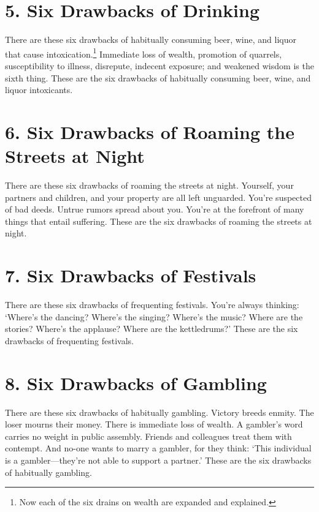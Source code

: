 \documentclass[12pt,openany]{book}%
\begin{document}
\section*{5. Six Drawbacks of Drinking }

There are these six drawbacks of habitually consuming beer, wine, and liquor that cause intoxication.\footnote{Now each of the six drains on wealth are expanded and explained. } Immediate loss of wealth, promotion of quarrels, susceptibility to illness, disrepute, indecent exposure; and weakened wisdom is the sixth thing. These are the six drawbacks of habitually consuming beer, wine, and liquor intoxicants. 

\section*{6. Six Drawbacks of Roaming the Streets at Night }

There are these six drawbacks of roaming the streets at night. Yourself, your partners and children, and your property are all left unguarded. You’re suspected of bad deeds. Untrue rumors spread about you. You’re at the forefront of many things that entail suffering. These are the six drawbacks of roaming the streets at night. 

\section*{7. Six Drawbacks of Festivals }

There are these six drawbacks of frequenting festivals. You’re always thinking: ‘Where’s the dancing? Where’s the singing? Where’s the music? Where are the stories? Where’s the applause? Where are the kettledrums?’ These are the six drawbacks of frequenting festivals. 

\section*{8. Six Drawbacks of Gambling }

There are these six drawbacks of habitually gambling. Victory breeds enmity. The loser mourns their money. There is immediate loss of wealth. A gambler’s word carries no weight in public assembly. Friends and colleagues treat them with contempt. And no-one wants to marry a gambler, for they think: ‘This individual is a gambler—they’re not able to support a partner.’ These are the six drawbacks of habitually gambling. 
\end{document}
